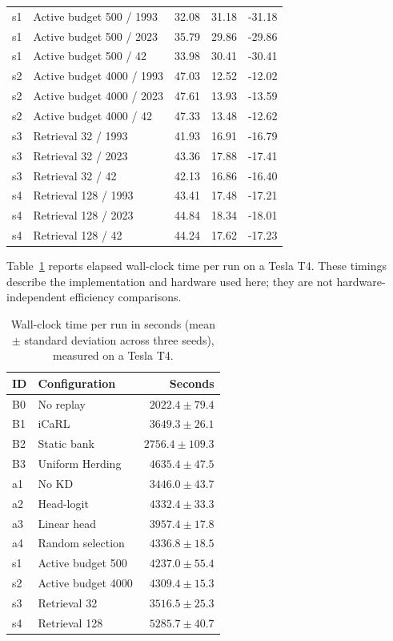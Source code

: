\begin{table}[htbp]
\begin{tabular}{llrrr}
    s1 & Active budget 500 / 1993 & 32.08 & 31.18 & -31.18 \\
    s1 & Active budget 500 / 2023 & 35.79 & 29.86 & -29.86 \\
    s1 & Active budget 500 / 42 & 33.98 & 30.41 & -30.41 \\
    s2 & Active budget 4000 / 1993 & 47.03 & 12.52 & -12.02 \\
    s2 & Active budget 4000 / 2023 & 47.61 & 13.93 & -13.59 \\
    s2 & Active budget 4000 / 42 & 47.33 & 13.48 & -12.62 \\
    s3 & Retrieval 32 / 1993 & 41.93 & 16.91 & -16.79 \\
    s3 & Retrieval 32 / 2023 & 43.36 & 17.88 & -17.41 \\
    s3 & Retrieval 32 / 42 & 42.13 & 16.86 & -16.40 \\
    s4 & Retrieval 128 / 1993 & 43.41 & 17.48 & -17.21 \\
    s4 & Retrieval 128 / 2023 & 44.84 & 18.34 & -18.01 \\
    s4 & Retrieval 128 / 42 & 44.24 & 17.62 & -17.23 \\
    \bottomrule
  \end{tabular}
\end{table}

Table~\ref{tab:app-compute} reports elapsed wall-clock time per run on a Tesla
T4.  These timings describe the implementation and hardware used here; they
are not hardware-independent efficiency comparisons.

\begin{table}[htbp]
  \centering
  \caption{Wall-clock time per run in seconds (mean $\pm$ standard deviation
  across three seeds), measured on a Tesla T4.}
  \label{tab:app-compute}
  \small
  \begin{tabular}{llr}
    \toprule
    ID & Configuration & Seconds \\
    \midrule
    B0 & No replay & $2022.4 \pm 79.4$ \\
    B1 & iCaRL & $3649.3 \pm 26.1$ \\
    B2 & Static bank & $2756.4 \pm 109.3$ \\
    B3 & Uniform Herding & $4635.4 \pm 47.5$ \\
    a1 & No KD & $3446.0 \pm 43.7$ \\
    a2 & Head-logit & $4332.4 \pm 33.3$ \\
    a3 & Linear head & $3957.4 \pm 17.8$ \\
    a4 & Random selection & $4336.8 \pm 18.5$ \\
    s1 & Active budget 500 & $4237.0 \pm 55.4$ \\
    s2 & Active budget 4000 & $4309.4 \pm 15.3$ \\
    s3 & Retrieval 32 & $3516.5 \pm 25.3$ \\
    s4 & Retrieval 128 & $5285.7 \pm 40.7$ \\
    \bottomrule
  \end{tabular}
\end{table}

